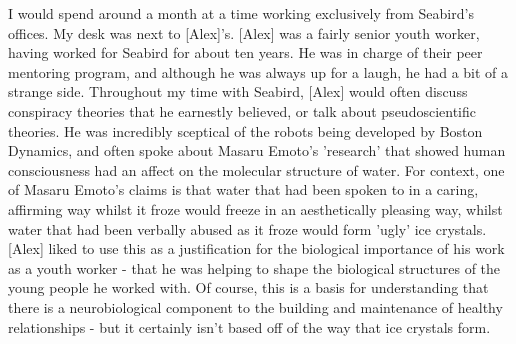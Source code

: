 
I would spend around a month at a time working exclusively from Seabird's offices. My desk was next to [Alex]'s. [Alex] was a fairly senior youth worker, having worked for Seabird for about ten years. He was in charge of their peer mentoring program, and although he was always up for a laugh, he had a bit of a strange side. Throughout my time with Seabird, [Alex] would often discuss conspiracy theories that he earnestly believed, or talk about pseudoscientific theories. He was incredibly sceptical of the robots being developed by Boston Dynamics, and often spoke about Masaru Emoto's 'research' that showed human consciousness had an affect on the molecular structure of water. For context, one of Masaru Emoto's claims is that water that had been spoken to in a caring, affirming way whilst it froze would freeze in an aesthetically pleasing way, whilst water that had been verbally abused as it froze would form 'ugly' ice crystals. [Alex] liked to use this as a justification for the biological importance of his work as a youth worker - that he was helping to shape the biological structures of the young people he worked with. Of course, this is a basis for understanding that there is a neurobiological component to the building and maintenance of healthy relationships - but it certainly isn't based off of the way that ice crystals form.

